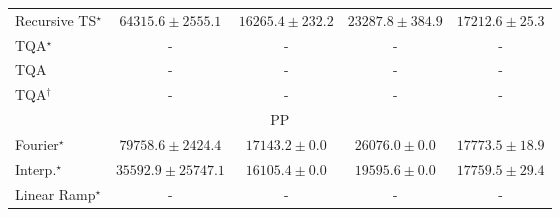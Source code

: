 \begin{tabular}{l|cccc|}
Recursive TS$^\star$ & {\cellcolor[HTML]{C44802}} \color[HTML]{F1F1F1} $64315.6\pm 2555.1$ & {\cellcolor[HTML]{FFFCD7}} \color[HTML]{000000} $16265.4\pm 232.2$ & {\cellcolor[HTML]{FFF3B4}} \color[HTML]{000000} $23287.8\pm 384.9$ & {\cellcolor[HTML]{FFFBD2}} \color[HTML]{000000} $17212.6\pm 25.3$ \\
TQA$^\star$ & {\cellcolor[HTML]{000000}} \color[HTML]{F1F1F1} {\cellcolor{white}} \color{black} - & {\cellcolor[HTML]{000000}} \color[HTML]{F1F1F1} {\cellcolor{white}} \color{black} - & {\cellcolor[HTML]{000000}} \color[HTML]{F1F1F1} {\cellcolor{white}} \color{black} - & {\cellcolor[HTML]{000000}} \color[HTML]{F1F1F1} {\cellcolor{white}} \color{black} - \\
TQA & {\cellcolor[HTML]{000000}} \color[HTML]{F1F1F1} {\cellcolor{white}} \color{black} - & {\cellcolor[HTML]{000000}} \color[HTML]{F1F1F1} {\cellcolor{white}} \color{black} - & {\cellcolor[HTML]{000000}} \color[HTML]{F1F1F1} {\cellcolor{white}} \color{black} - & {\cellcolor[HTML]{000000}} \color[HTML]{F1F1F1} {\cellcolor{white}} \color{black} - \\
TQA$^\dagger$ & {\cellcolor[HTML]{000000}} \color[HTML]{F1F1F1} {\cellcolor{white}} \color{black} - & {\cellcolor[HTML]{000000}} \color[HTML]{F1F1F1} {\cellcolor{white}} \color{black} - & {\cellcolor[HTML]{000000}} \color[HTML]{F1F1F1} {\cellcolor{white}} \color{black} - & {\cellcolor[HTML]{000000}} \color[HTML]{F1F1F1} {\cellcolor{white}} \color{black} - \\
\cline{1-5}
\multicolumn{5}{c}{\rule{0pt}{8pt}PP} \\
\midrule
Fourier$^\star$ & {\cellcolor[HTML]{004529}} \color[HTML]{F1F1F1} $79758.6\pm 2424.4$ & {\cellcolor[HTML]{FBFED2}} \color[HTML]{000000} $17143.2\pm 0.0$ & {\cellcolor[HTML]{E7F6AD}} \color[HTML]{000000} $26076.0\pm 0.0$ & {\cellcolor[HTML]{FBFDCE}} \color[HTML]{000000} $17773.5\pm 18.9$ \\
Interp.$^\star$ & {\cellcolor[HTML]{BCE395}} \color[HTML]{000000} $35592.9\pm 25747.1$ & {\cellcolor[HTML]{FCFED7}} \color[HTML]{000000} $16105.4\pm 0.0$ & {\cellcolor[HTML]{F9FDC4}} \color[HTML]{000000} $19595.6\pm 0.0$ & {\cellcolor[HTML]{FBFDCE}} \color[HTML]{000000} $17759.5\pm 29.4$ \\
Linear Ramp$^\star$ & {\cellcolor[HTML]{000000}} \color[HTML]{F1F1F1} {\cellcolor{white}} \color{black} - & {\cellcolor[HTML]{000000}} \color[HTML]{F1F1F1} {\cellcolor{white}} \color{black} - & {\cellcolor[HTML]{000000}} \color[HTML]{F1F1F1} {\cellcolor{white}} \color{black} - & {\cellcolor[HTML]{000000}} \color[HTML]{F1F1F1} {\cellcolor{white}} \color{black} - \\

\end{tabular}
